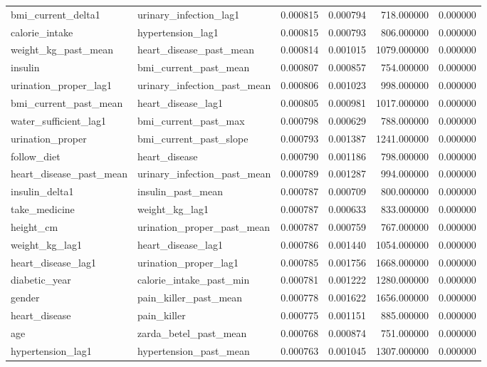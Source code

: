 \begin{longtable}{llrrrr}
bmi\_current\_delta1 & urinary\_infection\_lag1 & 0.000815 & 0.000794 & 718.000000 & 0.000000 \\
calorie\_intake & hypertension\_lag1 & 0.000815 & 0.000793 & 806.000000 & 0.000000 \\
weight\_kg\_past\_mean & heart\_disease\_past\_mean & 0.000814 & 0.001015 & 1079.000000 & 0.000000 \\
insulin & bmi\_current\_past\_mean & 0.000807 & 0.000857 & 754.000000 & 0.000000 \\
urination\_proper\_lag1 & urinary\_infection\_past\_mean & 0.000806 & 0.001023 & 998.000000 & 0.000000 \\
bmi\_current\_past\_mean & heart\_disease\_lag1 & 0.000805 & 0.000981 & 1017.000000 & 0.000000 \\
water\_sufficient\_lag1 & bmi\_current\_past\_max & 0.000798 & 0.000629 & 788.000000 & 0.000000 \\
urination\_proper & bmi\_current\_past\_slope & 0.000793 & 0.001387 & 1241.000000 & 0.000000 \\
follow\_diet & heart\_disease & 0.000790 & 0.001186 & 798.000000 & 0.000000 \\
heart\_disease\_past\_mean & urinary\_infection\_past\_mean & 0.000789 & 0.001287 & 994.000000 & 0.000000 \\
insulin\_delta1 & insulin\_past\_mean & 0.000787 & 0.000709 & 800.000000 & 0.000000 \\
take\_medicine & weight\_kg\_lag1 & 0.000787 & 0.000633 & 833.000000 & 0.000000 \\
height\_cm & urination\_proper\_past\_mean & 0.000787 & 0.000759 & 767.000000 & 0.000000 \\
weight\_kg\_lag1 & heart\_disease\_lag1 & 0.000786 & 0.001440 & 1054.000000 & 0.000000 \\
heart\_disease\_lag1 & urination\_proper\_lag1 & 0.000785 & 0.001756 & 1668.000000 & 0.000000 \\
diabetic\_year & calorie\_intake\_past\_min & 0.000781 & 0.001222 & 1280.000000 & 0.000000 \\
gender & pain\_killer\_past\_mean & 0.000778 & 0.001622 & 1656.000000 & 0.000000 \\
heart\_disease & pain\_killer & 0.000775 & 0.001151 & 885.000000 & 0.000000 \\
age & zarda\_betel\_past\_mean & 0.000768 & 0.000874 & 751.000000 & 0.000000 \\
hypertension\_lag1 & hypertension\_past\_mean & 0.000763 & 0.001045 & 1307.000000 & 0.000000 \\

\end{longtable}
